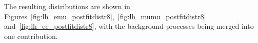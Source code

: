 The resulting distributions are shown in Figures~\ref{fig:lh_emu_postfitdistr8},~\ref{fig:lh_mumu_postfitdistr8} and~\ref{fig:lh_ee_postfitdistr8}, with the background processes
being merged into one contribution.




\begin{figure}[htbp!]
  \begin{center}


\end{center}
\end{figure}

